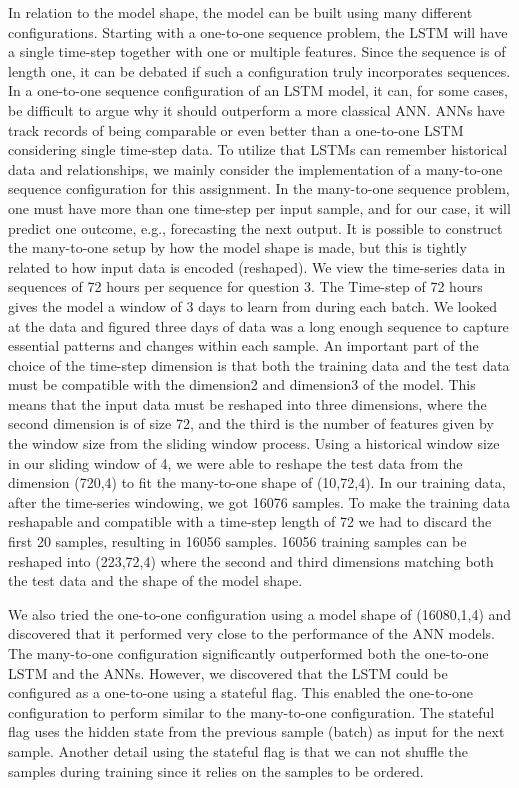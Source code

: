 \documentclass[11pt]{article}
\begin{document}
In relation to the model shape, the model can be built using many different configurations. Starting with a one-to-one sequence problem, the LSTM will have a single time-step together with one or multiple features. Since the sequence is of length one, it can be debated if such a configuration truly incorporates sequences. In a one-to-one sequence configuration of an LSTM model, it can, for some cases, be difficult to argue why it should outperform a more classical ANN. ANNs have track records of being comparable or even better than a one-to-one LSTM considering single time-step data. To utilize that LSTMs can remember historical data and relationships, we mainly consider the implementation of a many-to-one sequence configuration for this assignment. In the many-to-one sequence problem, one must have more than one time-step per input sample, and for our case, it will predict one outcome, e.g., forecasting the next output. It is possible to construct the many-to-one setup by how the model shape is made, but this is tightly related to how input data is encoded (reshaped). We view the time-series data in sequences of 72 hours per sequence for question 3. The Time-step of 72 hours gives the model a window of 3 days to learn from during each batch. We looked at the data and figured three days of data was a long enough sequence to capture essential patterns and changes within each sample. An important part of the choice of the time-step dimension is that both the training data and the test data must be compatible with the dimension2 and dimension3 of the model. This means that the input data must be reshaped into three dimensions, where the second dimension is of size 72, and the third is the number of features given by the window size from the sliding window process. Using a historical window size in our sliding window of 4, we were able to reshape the test data from the dimension (720,4) to fit the many-to-one shape of (10,72,4). In our training data, after the time-series windowing, we got 16076 samples. To make the training data reshapable and compatible with a time-step length of 72 we had to discard the first 20 samples, resulting in 16056 samples. 16056 training samples can be reshaped into (223,72,4) where the second and third dimensions matching both the test data and the shape of the model shape. 

We also tried the one-to-one configuration using a model shape of (16080,1,4) and discovered that it performed very close to the performance of the ANN models. The many-to-one configuration significantly outperformed both the one-to-one LSTM and the ANNs. However, we discovered that the LSTM could be configured as a one-to-one using a stateful flag. This enabled the one-to-one configuration to perform similar to the many-to-one configuration. The stateful flag uses the hidden state from the previous sample (batch) as input for the next sample. Another detail using the stateful flag is that we can not shuffle the samples during training since it relies on the samples to be ordered.  
\end{document}
